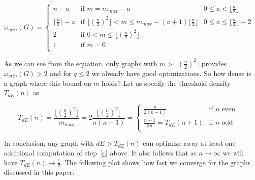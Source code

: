 \documentclass[a4paper]{article}
\begin{document}
\begin{equation}\label{omega}
\omega_{min}(G) = \left\{ \begin{array}{lll}
                           n - a & \text{if } m = m_{max} - a & 0 \leq a < \lfloor\frac{n}{2}\rfloor \\
                           \lceil\frac{n}{2}\rceil - a & \text{if } \lfloor(\frac{n}{2})^2\rfloor < m \leq m_{max} - (a + 1)\lfloor\frac{n}{2}\rfloor & 0 \leq a \leq \lfloor\frac{n}{2}\rfloor - 2 \\
                           2 & \text{if } 0 < m \leq \lfloor(\frac{n}{2})^2\rfloor & \\
                           1 & \text{if } m = 0 & \\
                          \end{array}
                  \right.
\end{equation}

As we can see from the equation, only graphs with $m > \lfloor(\frac{n}{2})^2\rfloor$ provides $\omega_{min}(G) > 2$ and for $q \leq 2$ we already have good optimizations. So how dense is a graph where this bound on $m$ holds? Let us specify the threshold density $T_{dE}(n)$ as

$$
T_{dE}(n) = \frac{\lfloor(\frac{n}{2})^2\rfloor}{m_{max}} = 2\frac{\lfloor(\frac{n}{2})^2\rfloor}{n(n-1)} = \left\{ \begin{array}{ll}
          \frac{n}{2(n-1)} & \text{if } n \text{ even}\\
          \frac{n + 1}{2n} = T_{dE}(n+1) & \text{if } n \text{ odd}\\
          \end{array}
  \right.
$$

In conclusion, any graph with $dE > T_{dE}(n)$ can optimize away at least one additional computation of step~\ref{q} above. It also follows that as $n \rightarrow \infty$ we will have $T_{dE}(n) \rightarrow \frac{1}{2}$. The following plot shows how fast we converge for the graphs discussed in this paper.

\begin{center}
\end{center}
\end{document}
